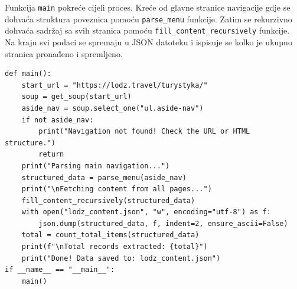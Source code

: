 \documentclass[]{foi}
\begin{document}
Funkcija \verb|main| pokreće cijeli proces. Kreće od glavne stranice navigacije gdje se dohvaća struktura poveznica pomoću \verb|parse_menu| funkcije.
Zatim se rekurzivno dohvaća sadržaj sa svih stranica pomoću \verb|fill_content_recursively| funkcije. Na kraju svi podaci se spremaju u JSON datoteku 
i ispisuje se kolko je ukupno stranica pronađeno i spremljeno.

\begin{longlisting}
\begin{verbatim}
def main():
    start_url = "https://lodz.travel/turystyka/"
    soup = get_soup(start_url)
    aside_nav = soup.select_one("ul.aside-nav")
    if not aside_nav:
        print("Navigation not found! Check the URL or HTML structure.")
        return
    print("Parsing main navigation...")
    structured_data = parse_menu(aside_nav)
    print("\nFetching content from all pages...")
    fill_content_recursively(structured_data)
    with open("lodz_content.json", "w", encoding="utf-8") as f:
        json.dump(structured_data, f, indent=2, ensure_ascii=False)
    total = count_total_items(structured_data)
    print(f"\nTotal records extracted: {total}")
    print("Done! Data saved to: lodz_content.json")
if __name__ == "__main__":
    main()
\end{verbatim}
\caption{Scraper 5/6}
\label{lst:scraper5}
\end{longlisting}
\newpage
\end{document}
